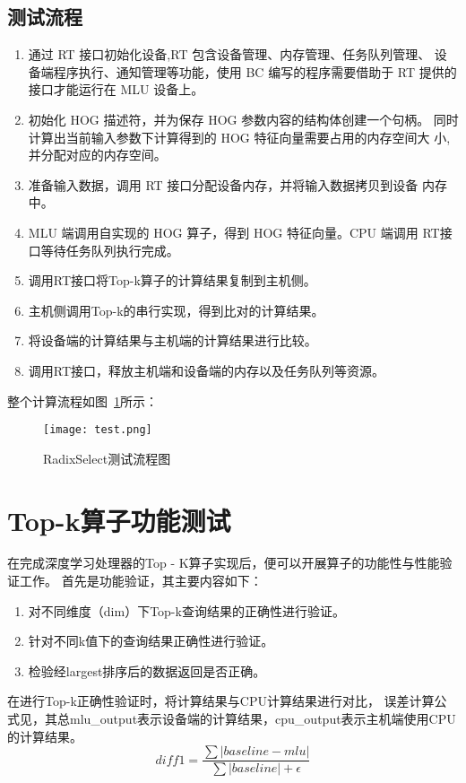 \subsection{测试流程}
\begin{enumerate}
    \item 通过 RT 接口初始化设备,RT 包含设备管理、内存管理、任务队列管理、 设备端程序执行、通知管理等功能，使用 BC 编写的程序需要借助于 RT 提供的 接口才能运行在 MLU 设备上。
    \item 初始化 HOG 描述符，并为保存 HOG 参数内容的结构体创建一个句柄。 同时计算出当前输入参数下计算得到的 HOG 特征向量需要占用的内存空间大 小, 并分配对应的内存空间。
    \item 准备输入数据，调用 RT 接口分配设备内存，并将输入数据拷贝到设备 内存中。
    \item MLU 端调用自实现的 HOG 算子，得到 HOG 特征向量。CPU 端调用 RT接口等待任务队列执行完成。
    
    \item 调用RT接口将Top-k算子的计算结果复制到主机侧。
    \item 主机侧调用Top-k的串行实现，得到比对的计算结果。
    \item 将设备端的计算结果与主机端的计算结果进行比较。
    \item 调用RT接口，释放主机端和设备端的内存以及任务队列等资源。
    
\end{enumerate}
整个计算流程如图~\ref{fig:test}所示：

\begin{figure}[ht]
    \centering
    \texttt{[image: test.png]}
    \caption{RadixSelect测试流程图}
    \label{fig:test}
\end{figure}


\section{Top-k算子功能测试}
在完成深度学习处理器的Top - K算子实现后，便可以开展算子的功能性与性能验证工作。
首先是功能验证，其主要内容如下：
\begin{enumerate}
\item 对不同维度（dim）下Top-k查询结果的正确性进行验证。
\item 针对不同k值下的查询结果正确性进行验证。
\item 检验经largest排序后的数据返回是否正确。
\end{enumerate}

在进行Top-k正确性验证时，将计算结果与CPU计算结果进行对比，
误差计算公式见，其总mlu\_output表示设备端的计算结果，cpu\_output表示主机端使用CPU的计算结果。
    \begin{equation}
    \label{eq:diff1}
    diff1 = \frac{\sum \vert baseline - mlu \vert}{\sum \vert baseline \vert + \epsilon}
    \end{equation}
    
